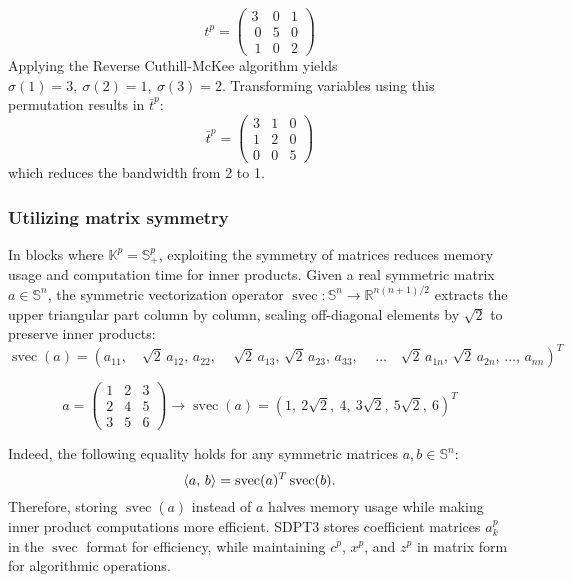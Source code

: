 \begin{example}
\[
    t^p = \begin{pmatrix}
        3 & 0 & 1 \\\
        0 & 5 & 0 \\\
        1 & 0 & 2
    \end{pmatrix}
\]
Applying the Reverse Cuthill-McKee algorithm yields $\sigma(1)=3, ~ \sigma(2)=1, ~ \sigma(3)=2$.
Transforming variables using this permutation results in $\bar{t}^p$:
\[
    \bar{t}^p = \begin{pmatrix}
        3 & 1 & 0 \\
        1 & 2 & 0 \\
        0 & 0 & 5
    \end{pmatrix}
\]
which reduces the bandwidth from 2 to 1.
\end{example}


\subsubsection{Utilizing matrix symmetry}
In blocks where $\mathbb{K}^p=\mathbb{S}_+^p$, exploiting the symmetry of matrices reduces memory usage and computation time for inner products.
Given a real symmetric matrix $a\in \mathbb{S}^n$, the symmetric vectorization operator $\operatorname{svec}: \mathbb{S}^n \rightarrow \mathbb{R}^{n(n+1)/2}$ extracts the upper triangular part column by column, scaling off-diagonal elements by $\sqrt{2}$ to preserve inner products:
\[ \operatorname{svec}(a) = (a_{11}, \quad \sqrt{2}\,a_{12},\, a_{22},\, \quad \sqrt{2}\,a_{13},\, \sqrt{2}\,a_{23},\, a_{33},\, \quad \ldots \quad  \sqrt{2}\,a_{1n},\, \sqrt{2}\,a_{2n},\, \ldots,\, a_{nn})^T \]
\begin{example}
\[a = \begin{pmatrix}
    1 & 2 & 3\\
    2 & 4 & 5\\
    3 & 5 & 6
\end{pmatrix} \rightarrow \operatorname{svec}(a) = (1, ~ 2\sqrt{2}, ~ 4, ~ 3\sqrt{2}, ~ 5\sqrt{2}, ~ 6)^T\]
\end{example}

\medskip

Indeed, the following equality holds for any symmetric matrices $a, b \in \mathbb{S}^n$:
\[\left\langle a, \, b \right\rangle = \operatorname{svec}(a)^T \operatorname{svec}(b).\]
Therefore, storing $\operatorname{svec}(a)$ instead of $a$ halves memory usage while making inner product computations more efficient.
SDPT3 stores coefficient matrices $a^p_k$ in the $\operatorname{svec}$ format for efficiency, while maintaining $c^p$, $x^p$, and $z^p$ in matrix form for algorithmic operations.


